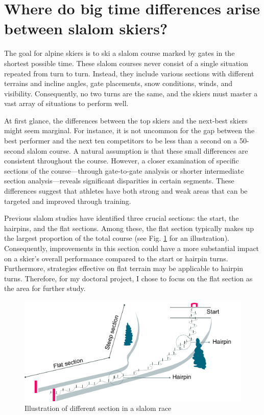 
\section{Where do big time differences arise between slalom skiers? }
The goal for alpine skiers is to ski a slalom course marked by gates in the shortest possible time. These slalom courses never consist of a single situation repeated from turn to turn. Instead, they include various sections with different terrains and incline angles, gate placements, snow conditions, winds, and visibility. Consequently, no two turns are the same, and the skiers must master a vast array of situations to perform well. 

At first glance, the differences between the top skiers and the next-best skiers might seem marginal. For instance, it is not uncommon for the gap between the best performer and the next ten competitors to be less than a second on a 50-second slalom course. A natural assumption is that these small differences are consistent throughout the course. However, a closer examination of specific sections of the course—through gate-to-gate analysis or shorter intermediate section analysis—reveals significant disparities in certain segments\cite{supej_relations_2006, reid_kinematic_2010, supej_new_2011, supej_mechanical_2011, federolf_quantifying_2012}. These differences suggest that athletes have both strong and weak areas that can be targeted and improved through training.

Previous slalom studies have identified three crucial sections: the start, the hairpins, and the flat sections\cite{supej_new_2011}. Among these, the flat section typically makes up the largest proportion of the total course (see Fig. \ref{fig: flatcourse} for an illustration). Consequently, improvements in this section could have a more substantial impact on a skier's overall performance compared to the start or hairpin turns. Furthermore, strategies effective on flat terrain may be applicable to hairpin turns. Therefore, for my doctoral project, I chose to focus on the flat section as the area for further study.

\begin{figure}
    \centering
    \includegraphics[width=1\linewidth]{figure/figure_introduction_course.pdf}
    \caption{Illustration of different section in a slalom race}
    \label{fig: flatcourse}
\end{figure}

